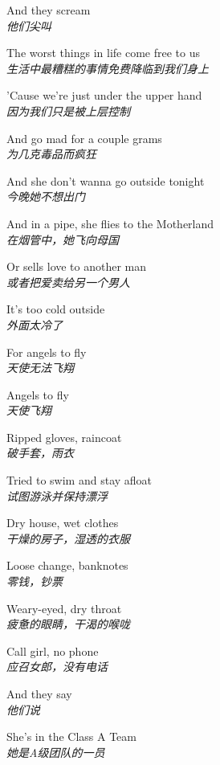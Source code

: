 \begin{spacing}{1.5}
\begin{flushleft}
And they scream\\
\textit{他们尖叫}\lyricspace

The worst things in life come free to us\\
\textit{生活中最糟糕的事情免费降临到我们身上}\lyricspace

'Cause we're just under the upper hand\\
\textit{因为我们只是被上层控制}\lyricspace

And go mad for a couple grams\\
\textit{为几克毒品而疯狂}\lyricspace

And she don't wanna go outside tonight\\
\textit{今晚她不想出门}\lyricspace

And in a pipe, she flies to the Motherland\\
\textit{在烟管中，她飞向母国}\lyricspace

Or sells love to another man\\
\textit{或者把爱卖给另一个男人}\lyricspace

It's too cold outside\\
\textit{外面太冷了}\lyricspace

For angels to fly\\
\textit{天使无法飞翔}\lyricspace

Angels to fly\\
\textit{天使飞翔}\lyricspace

Ripped gloves, raincoat\\
\textit{破手套，雨衣}\lyricspace

Tried to swim and stay afloat\\
\textit{试图游泳并保持漂浮}\lyricspace

Dry house, wet clothes\\
\textit{干燥的房子，湿透的衣服}\lyricspace

Loose change, banknotes\\
\textit{零钱，钞票}\lyricspace

Weary-eyed, dry throat\\
\textit{疲惫的眼睛，干渴的喉咙}\lyricspace

Call girl, no phone\\
\textit{应召女郎，没有电话}\lyricspace

And they say\\
\textit{他们说}\lyricspace

She's in the Class A Team\\
\textit{她是A级团队的一员}\lyricspace


\end{flushleft}
\end{spacing}
